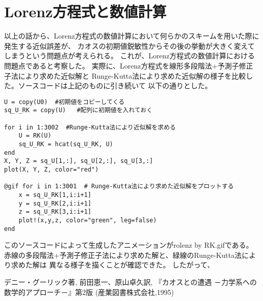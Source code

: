 \documentclass[12pt]{ltjsarticle}
\begin{document}
\section{Lorenz方程式と数値計算}
以上の話から、Lorenz方程式の数値計算において何らかのスキームを用いた際に発生する近似誤差が、
カオスの初期値鋭敏性からその後の挙動が大きく変えてしまうという問題点が考えられる。
これが、Lorenz方程式の数値計算における問題点であると考察した。
実際に、Lorenz方程式を線形多段階法+予測子修正子法により求めた近似解と
Runge-Kutta法により求めた近似解の様子を比較した。ソースコードは上記のものに引き続いて
以下の通りとした。
\begin{lstlisting}
U = copy(U0)  #初期値をコピーしてくる
sq_U_RK = copy(U)   #配列に初期値を入れておく

for i in 1:3002  #Runge-Kutta法により近似解を求める
    U = RK(U)
    sq_U_RK = hcat(sq_U_RK, U)
end
X, Y, Z = sq_U[1,:], sq_U[2,:], sq_U[3,:]
plot(X, Y, Z, color="red")

@gif for i in 1:3001  # Runge-Kutta法により求めた近似解をプロットする
    x = sq_U_RK[1,i:i+1]
    y = sq_U_RK[2,i:i+1]
    z = sq_U_RK[3,i:i+1]
    plot!(x,y,z, color="green", leg=false)
end
\end{lstlisting}
このソースコードによって生成したアニメーションがrolenz by RK.gifである。
赤線の多段階法+予測子修正子法により求めた解と、緑線のRunge-Kutta法により求めた解は
異なる様子を描くことが確認できた。
したがって、
\begin{thebibliography}{1}
     デニー・グーリック著, 前田恵一、原山卓久訳,
    『カオスとの遭遇 －力学系への数学的アプローチ－』第2版 (産業図書株式会社,1995)
\end{thebibliography}
\end{document}
